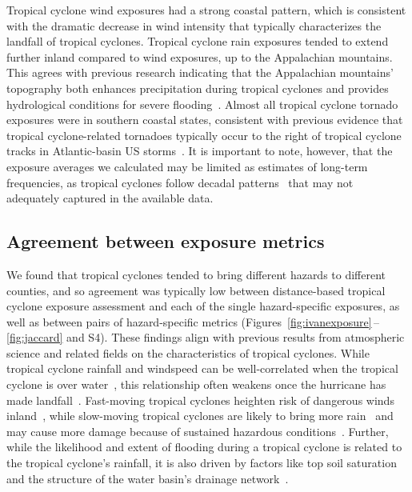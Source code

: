 Tropical cyclone wind exposures had a strong coastal pattern, which is
consistent with the dramatic decrease in wind intensity that typically
characterizes the landfall of tropical cyclones.  Tropical cyclone rain
exposures tended to extend further inland compared to wind exposures, up to
the Appalachian mountains. This agrees with previous research indicating that
the Appalachian mountains' topography both enhances precipitation during
tropical cyclones and provides hydrological conditions for severe
flooding~\parencite{rees2001}.  Almost all tropical cyclone tornado exposures
were in southern coastal states, consistent with previous evidence that
tropical cyclone-related tornadoes typically occur to the right of tropical
cyclone tracks in Atlantic-basin \ac{US} storms~\parencite{moore2012}.  It is
important to note, however, that the exposure averages we calculated may be
limited as estimates of long-term frequencies, as tropical cyclones follow
decadal patterns~\parencite{kossin2007more} that may not adequately captured in
the available data. 

\subsection*{Agreement between exposure metrics}

We found that tropical cyclones tended to bring different hazards to different
counties, and so agreement was typically low between distance-based
tropical cyclone exposure assessment and each of the single hazard-specific
exposures, as well as between pairs of hazard-specific metrics
(Figures~\ref{fig:ivanexposure}\,--\,\ref{fig:jaccard} and S4).  These
findings align with previous results from atmospheric science and related
fields on the characteristics of tropical cyclones. While tropical cyclone
rainfall and windspeed can be well-correlated when the tropical cyclone is over
water~\parencite{cerveny2000}, this relationship often weakens once the
hurricane has made landfall~\parencite{jiang2008}.  Fast-moving tropical
cyclones heighten risk of dangerous winds inland~\parencite{kruk2010},
while slow-moving tropical cyclones are likely to bring more
rain~\parencite{rappaport2000} and may cause more damage because of sustained
hazardous conditions~\parencite{rezapour2014}. Further, while the likelihood
and extent of flooding during a tropical cyclone is related to the tropical
cyclone's rainfall, it is also driven by factors like top soil saturation and
the structure of the water basin's drainage network~\parencite{chen2015,
rees2001}. 


